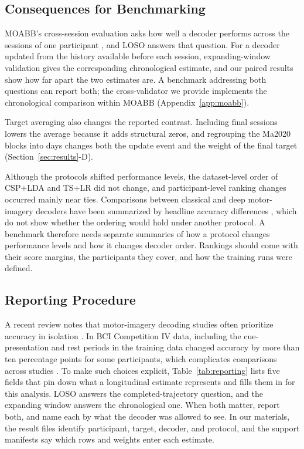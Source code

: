 \documentclass{ieeeaccess}
\begin{document}
\subsection{Consequences for Benchmarking}
MOABB's cross-session evaluation asks how well a decoder performs across the
sessions of one participant \cite{jayaram2018moabb}, and LOSO answers that
question. For a decoder updated from the history available before each session,
expanding-window validation gives the corresponding chronological estimate, and
our paired results show how far apart the two estimates are. A benchmark
addressing both questions can report both; the cross-validator we provide
implements the chronological comparison within MOABB
(Appendix~\ref{app:moabb}).

Target averaging also changes the reported contrast. Including final sessions
lowers the average because it adds structural zeros, and regrouping the Ma2020
blocks into days changes both the update event and the weight of the final
target (Section~\ref{sec:results}-D).

Although the protocols shifted performance levels, the dataset-level order of
CSP+LDA and TS+LR did not change, and participant-level ranking changes occurred
mainly near ties. Comparisons between classical and deep motor-imagery decoders
have been summarized by headline accuracy differences \cite{george2022sota},
which do not show whether the ordering would hold under another protocol. A
benchmark therefore needs separate summaries of how a protocol changes
performance levels and how it changes decoder order. Rankings should come with
their score margins, the participants they cover, and how the training runs
were defined.

\subsection{Reporting Procedure}
A recent review notes that motor-imagery decoding studies often prioritize
accuracy in isolation \cite{raza2025deep}. In BCI Competition IV data,
including the cue-presentation and rest periods in the training data changed
accuracy by more than ten percentage points for some participants, which
complicates comparisons across studies \cite{suemitsu2023visual}. To make such
choices explicit, Table~\ref{tab:reporting} lists five fields that pin down what
a longitudinal estimate represents and fills them in for this analysis. LOSO answers the completed-trajectory question, and the expanding window
answers the chronological one. When both matter, report both, and
name each by what the decoder was allowed to see. In our materials, the result
files identify participant, target, decoder, and protocol, and the support
manifests say which rows and weights enter each estimate.
\end{document}
